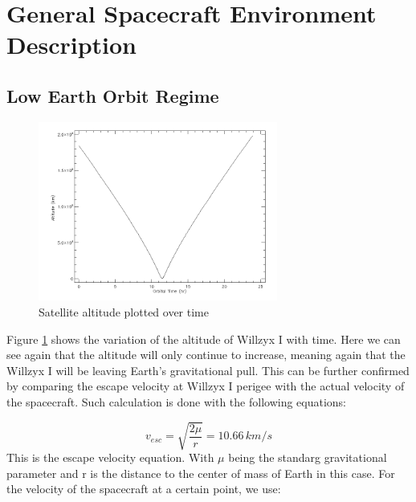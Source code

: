 \clearpage

\section{\label{sec:general}General Spacecraft Environment Description}

\subsection{Low Earth Orbit Regime}

\begin{figure}[H]
\centering
\includegraphics[width=0.7\textwidth]{figures/AltVSTime.png}
\caption{Satellite altitude plotted over time}
\label{AltPlot}
\end{figure}

Figure \ref{AltPlot} shows the variation of the  altitude of Willzyx I with time. Here we can see again that the altitude will only continue to increase, meaning again that the Willzyx I will be leaving Earth's gravitational pull. This can be further confirmed by comparing the escape velocity at Willzyx I perigee with the actual velocity of the spacecraft. Such calculation is done with the following equations:

\begin{equation}
v_{esc}=\sqrt{\frac{2\mu}{r}}=10.66\,km/s
\label{Vesc}
\end{equation}
This is the escape velocity equation. With $\mu$ being the standarg gravitational parameter and r is the distance to the center of mass of Earth in this case. For the velocity of the spacecraft at a certain point, we use:

